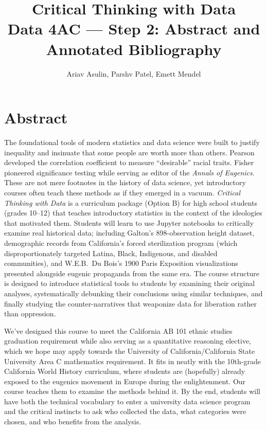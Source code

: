 \documentclass[12pt]{article}
\title{\textbf{Critical Thinking with Data}\\[0.5em]
\large Data 4AC --- Step 2: Abstract and Annotated Bibliography}
\author{Ariav Asulin, Parshv Patel, Emett Mendel}
\date{}
\begin{document}
\maketitle

\section*{Abstract}

The foundational tools of modern statistics and data science were built to justify inequality and insinuate that some people are worth more than others. Pearson developed the correlation coefficient to measure ``desirable'' racial traits. Fisher pioneered significance testing while serving as editor of the \textit{Annals of Eugenics}. These are not mere footnotes in the history of data science, yet introductory courses often teach these methods as if they emerged in a vacuum. \textit{Critical Thinking with Data} is a curriculum package (Option B) for high school students (grades 10--12) that teaches introductory statistics in the context of the ideologies that motivated them. Students will learn to use Jupyter notebooks to critically examine real historical data; including Galton's 898-observation height dataset, demographic records from California's forced sterilization program (which disproportionately targeted Latina, Black, Indigenous, and disabled communities), and W.E.B.\ Du Bois's 1900 Paris Exposition visualizations presented alongside eugenic propaganda from the same era. The course structure is designed to introduce statistical tools to students by examining their original analyses, systematically debunking their conclusions using similar techniques, and finally studying the counter-narratives that weaponize data for liberation rather than oppression.

We've designed this course to meet the California AB 101 ethnic studies graduation requirement while also serving as a quantitative reasoning elective, which we hope may apply towards the University of California/California State University Area C mathematics requirement. It fits in neatly with the 10th-grade California World History curriculum, where students are (hopefully) already exposed to the eugenics movement in Europe during the enlightenment. Our course teaches them to examine the methods behind it. By the end, students will have both the technical vocabulary to enter a university data science program and the critical instincts to ask who collected the data, what categories were chosen, and who benefits from the analysis.
\end{document}

